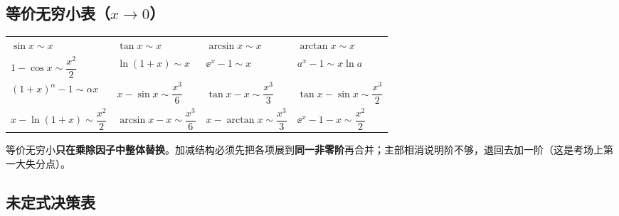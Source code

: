 \documentclass[UTF8,11pt]{ctexart}
\begin{document}


\subsection{\texorpdfstring{等价无穷小表（$x\to0$）}{等价无穷小表（x 趋于 0）}}

\begin{center}
\renewcommand{\arraystretch}{1.3}
\begin{tabular}{@{}llll@{}}
\toprule
$\sin x\sim x$ & $\tan x\sim x$ & $\arcsin x\sim x$ & $\arctan x\sim x$ \\
$1-\cos x\sim \dfrac{x^2}{2}$ & $\ln(1+x)\sim x$ & $\ee^x-1\sim x$ & $a^x-1\sim x\ln a$ \\
$(1+x)^\alpha-1\sim \alpha x$ & $x-\sin x\sim \dfrac{x^3}{6}$ & $\tan x-x\sim \dfrac{x^3}{3}$ & $\tan x-\sin x\sim \dfrac{x^3}{2}$ \\
$x-\ln(1+x)\sim \dfrac{x^2}{2}$ & $\arcsin x-x\sim \dfrac{x^3}{6}$ & $x-\arctan x\sim \dfrac{x^3}{3}$ & $\ee^x-1-x\sim \dfrac{x^2}{2}$ \\
\bottomrule
\end{tabular}
\end{center}

\begin{warnbox}[换的边界]
等价无穷小\textbf{只在乘除因子中整体替换}。加减结构必须先把各项展到\textbf{同一非零阶}再合并；主部相消说明阶不够，退回去加一阶（这是考场上第一大失分点）。
\end{warnbox}

\subsection{未定式决策表}
\end{document}
